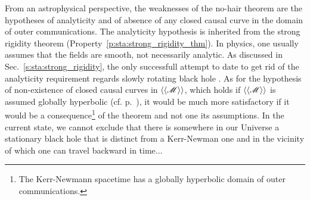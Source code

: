 From an astrophysical perspective, the weaknesses of the no-hair theorem are
the hypotheses of analyticity and of absence of any closed causal curve
in the domain of outer communications. The analyticity hypothesis is
inherited from the strong rigidity theorem (Property~\ref{p:sta:strong_rigidity_thm}).
In physics, one usually assumes that the fields are smooth, not necessarily
analytic. As discussed in Sec.~\ref{s:sta:strong_rigidity}, the only successfull
attempt to date to get rid of the analyticity requirement regards slowly rotating
black hole \cite{AlexaIK14}. As for the hypothesis of non-existence of closed
causal curves in $\langle\langle \mathscr{M}\rangle\rangle$, which holds if
$\langle\langle \mathscr{M}\rangle\rangle$
is assumed globally hyperbolic (cf. p.~\pageref{d:sta:glob_hyperbol}),
it would be much more satisfactory if it would be a consequence\footnote{The Kerr-Newmann spacetime has a globally hyperbolic domain of outer
communications.} of the theorem and not one its assumptions.
In the current state, we cannot exclude that there is somewhere in our Universe
a stationary black hole that is distinct from a Kerr-Newman one and in the vicinity
of which one can travel backward in time...


